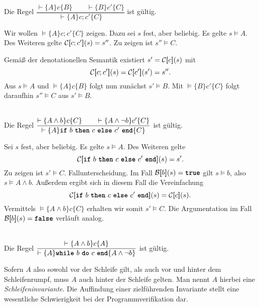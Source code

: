 \begin{Satz}\mbox{}\\[4pt]
Die Regel $\dfrac{\vdash\{A\}c\{B\}\qquad \vdash\{B\}c'\{C\}}{\vdash\{A\}c; c'\{C\}}$
ist gültig.
\end{Satz}
\begin{Beweis}
Wir wollen $\models\{A\} c; c'\{C\}$ zeigen.
Dazu sei $s$ fest, aber beliebig. Es gelte $s\models A$. Des Weiteren
gelte $\mathcal C[\hspace{-2.6pt}[c;c']\hspace{-2.4pt}](s)=s''$. Zu zeigen ist $s''\models C$.

Gemäß der denotationellen Semantik existiert $s'=\mathcal C[\hspace{-2.6pt}[c]\hspace{-2.4pt}](s)$ mit
\[\mathcal C[\hspace{-2.6pt}[c;c']\hspace{-2.4pt}](s) = \mathcal C[\hspace{-2.6pt}[c']\hspace{-2.4pt}](s')=s''.\]
Aus $s\models A$ und $\models\{A\}c\{B\}$ folgt nun zunächst $s'\models B$.
Mit $\models\{B\}c'\{C\}$ folgt daraufhin $s''\models C$ aus
$s'\models B$.\,\qedsymbol
\end{Beweis}

\begin{Satz}\mbox{}\\[4pt]
Die Regel $\dfrac{\vdash\{A\land b\}c\{C\}\qquad\vdash\{A\land\lnot b\}c'\{C\}}{
\vdash\{A\}\text{\kw{if} $b$ \kw{then} $c$ \kw{else} $c'$ \kw{end}}\{C\}}$
ist gültig.
\end{Satz}
\begin{Beweis}
Sei $s$ fest, aber beliebig. Es gelte $s\models A$. Des Weiteren gelte
\[\evC\qb{\text{\kw{if} $b$ \kw{then} $c$ \kw{else} $c'$ \kw{end}}}(s) = s'.\]
Zu zeigen ist $s'\models C$. Fallunterscheidung. Im Fall
$\evB\qb{b}(s)=\kw{true}$ gilt $s\models b$, also $s\models A\land b$.
Außerdem ergibt sich in diesem Fall die Vereinfachung
\[\evC\qb{\text{\kw{if} $b$ \kw{then} $c$ \kw{else} $c'$ \kw{end}}}(s) = \evC\qb{c}(s).\]
Vermittels $\models\{A\land b\}c\{C\}$ erhalten wir somit $s'\models C$.
Die Argumentation im Fall $\evB\qb{b}(s)=\kw{false}$ verläuft analog.\,\qedsymbol
\end{Beweis}

\begin{Satz}\mbox{}\\[4pt]
Die Regel $\dfrac{\vdash\{A\land b\}c\{A\}}{
\vdash\{A\}\text{\kw{while} $b$ \kw{do} $c$ \kw{end}}\{A\land\lnot b\}}$
ist gültig.
\end{Satz}
Sofern $A$ also sowohl vor der Schleife gilt, als auch vor und hinter
dem Schleifenrumpf, muss $A$ auch hinter der Schleife gelten. Man nennt
$A$ hierbei eine \emph{Schleifeninvariante}. Die Auffindung einer
zielführenden Invariante stellt eine wesentliche Schwierigkeit bei der
Programmverifikation dar.

